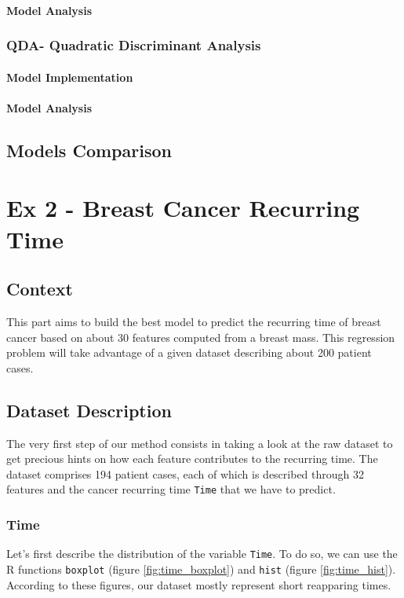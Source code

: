 \documentclass[]{report}
\begin{document}
\subsubsection{Model Analysis}


\subsection{QDA- Quadratic Discriminant Analysis}
\subsubsection{Model Implementation}
\subsubsection{Model Analysis}


\section{Models Comparison}




\chapter{Ex 2 - Breast Cancer Recurring Time}

\section{Context}
This part aims to build the best model to predict the recurring time of breast cancer based on about 30 features computed from a breast mass.  This regression problem will take advantage of a given dataset describing about 200 patient cases.

\section{Dataset Description}
The very first step of our method consists in taking a look at the raw dataset to get precious hints on how each feature contributes to the recurring time. The dataset comprises 194 patient cases, each of which is described through 32 features and the cancer recurring time \texttt{Time} that we have to predict.

\subsection{Time}
Let's first describe the distribution of the variable \texttt{Time}. To do so, we can use the R functions \texttt{boxplot} (figure \ref{fig:time_boxplot}) and \texttt{hist} (figure \ref{fig:time_hist}). According to these figures, our dataset mostly represent short reapparing times.
\end{document}
